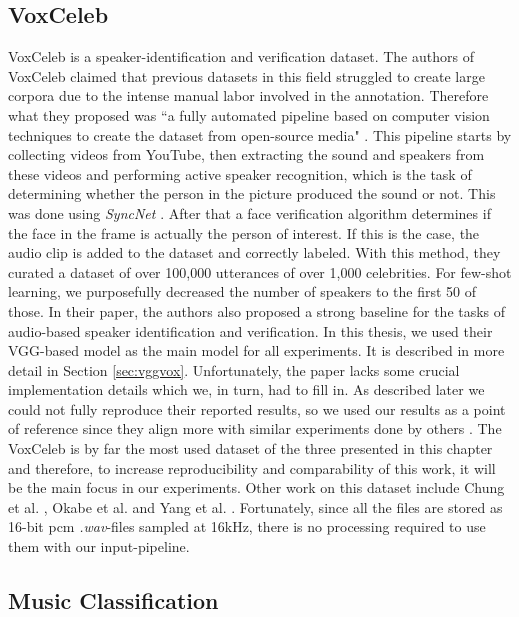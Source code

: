 \subsection{VoxCeleb}

VoxCeleb is a speaker-identification and verification dataset. The authors of VoxCeleb claimed that previous datasets in this field struggled to create large corpora due to the intense manual labor involved in the annotation. Therefore what they proposed was “a fully automated pipeline based on computer vision techniques to create the dataset from open-source media" \cite{Chung18b}. This pipeline starts by collecting videos from YouTube, then extracting the sound and speakers from these videos and performing active speaker recognition, which is the task of determining whether the person in the picture produced the sound or not. This was done using \textit{SyncNet} \cite{Chung16a}. After that a face verification algorithm determines if the face in the frame is actually the person of interest. If this is the case, the audio clip is added to the dataset and correctly labeled. With this method, they curated a dataset of over 100,000 utterances of over 1,000 celebrities. For few-shot learning, we purposefully decreased the number of speakers to the first 50 of those. In their paper, the authors also proposed a strong baseline for the tasks of audio-based speaker identification and verification. In this thesis, we used their VGG-based model as the main model for all experiments. It is described in more detail in Section \ref{sec:vggvox}. Unfortunately, the paper lacks some crucial implementation details which we, in turn, had to fill in. As described later we could not fully reproduce their reported results, so we used our results as a point of reference since they align more with similar experiments done by others \cite{viashin2019}. The VoxCeleb is by far the most used dataset of the three presented in this chapter and therefore, to increase reproducibility and comparability of this work, it will be the main focus in our experiments. Other work on this dataset include Chung et al. \cite{chung2020delving}, Okabe et al. \cite{Okabe_2018} and Yang et al. \cite{yang2020speakerveri}. Fortunately, since all the files are stored as 16-bit \gls{pcm} \textit{.wav}-files sampled at 16kHz, there is no processing required to use them with our input-pipeline.

\subsection{Music Classification}

